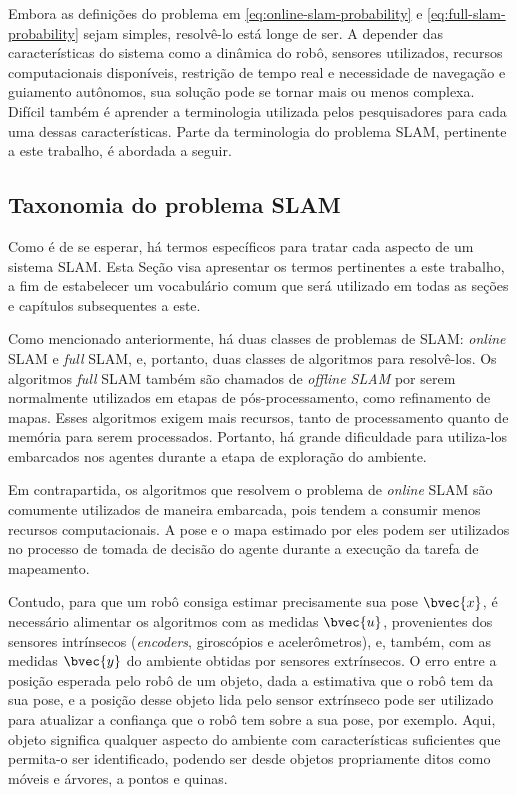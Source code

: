 Embora as definições do problema em \ref{eq:online-slam-probability} e 
\ref{eq:full-slam-probability} sejam simples, resolvê-lo está longe de ser. 
A depender das características do sistema como a dinâmica do robô, sensores utilizados, recursos computacionais disponíveis, restrição de tempo real e 
necessidade de navegação e guiamento autônomos, sua solução pode se tornar mais 
ou menos complexa. Difícil também é aprender a terminologia utilizada pelos 
pesquisadores para cada uma dessas características. Parte da terminologia do problema SLAM,
pertinente a este trabalho, é abordada a seguir.

\subsection*{Taxonomia do problema SLAM}
Como é de se esperar, há termos específicos para tratar cada aspecto de um 
sistema SLAM. Esta Seção visa apresentar os termos pertinentes a este trabalho, 
a fim de estabelecer um vocabulário comum que será utilizado em todas as seções 
e capítulos subsequentes a este.

Como mencionado anteriormente, há duas classes de problemas de SLAM: 
\textit{online} SLAM e \textit{full} SLAM, e, portanto, duas classes de 
algoritmos para resolvê-los. Os algoritmos \textit{full} SLAM também são chamados 
de \emph{offline SLAM} por serem normalmente utilizados em etapas de pós-processamento, como refinamento de mapas. Esses algoritmos exigem mais 
recursos, tanto de processamento quanto de memória para serem processados. 
Portanto, há grande dificuldade para utiliza-los embarcados nos agentes durante 
a etapa de exploração do ambiente.

Em contrapartida, os algoritmos que resolvem o problema de \textit{online} 
SLAM são comumente utilizados de maneira embarcada, pois tendem a 
consumir menos recursos computacionais. A pose e o mapa estimado por eles podem 
ser utilizados no processo de tomada de decisão do agente durante a execução da 
tarefa de mapeamento. 

Contudo, para que um robô consiga estimar precisamente sua pose $\bvec{x}$, é 
necessário alimentar os algoritmos com as medidas $\bvec{u}$, provenientes dos 
sensores intrínsecos (\textit{encoders}, giroscópios e acelerômetros), e, 
também, com as medidas $\bvec{y}$ do ambiente obtidas por sensores extrínsecos. O erro 
entre a posição esperada pelo robô de um objeto, dada a estimativa que o robô tem da sua pose, e a posição desse objeto lida pelo sensor extrínseco pode ser 
utilizado para atualizar a confiança que o robô tem sobre a sua pose, por 
exemplo. Aqui, objeto significa qualquer aspecto do ambiente com características 
suficientes que permita-o ser identificado, podendo ser desde objetos
propriamente ditos como móveis e árvores, a pontos e quinas.

